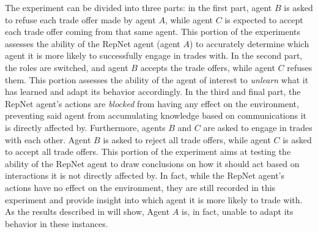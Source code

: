The experiment can be divided into three parts: in the first part, agent $B$ is asked to refuse each trade offer made by agent $A$, while agent $C$ is expected to accept each trade offer coming from that same agent. This portion of the experiments assesses the ability of the RepNet agent (agent $A$) to accurately determine which agent it is more likely to successfully engage in trades with. In the second part, the roles are switched, and agent $B$ accepts the trade offers, while agent $C$ refuses them. This portion assesses the ability of the agent of interest to \textit{unlearn} what it has learned and adapt its behavior accordingly. 
In the third and final part, the RepNet agent's actions are \textit{blocked} from having any effect on the environment, preventing said agent from accumulating knowledge based on communications it is directly affected by. Furthermore, agents $B$ and $C$ are asked to engage in trades with each other. Agent $B$ is asked to reject all trade offers, while agent $C$ is asked to accept all trade offers. This portion of the experiment aims at testing the ability of the RepNet agent to draw conclusions on how it should act based on interactions it is not directly affected by. In fact, while the RepNet agent's actions have no effect on the environment, they are still recorded in this experiment and provide insight into which agent it is more likely to trade with. As the results described in  will show, Agent $A$ is, in fact, unable to adapt its behavior in these instances.


